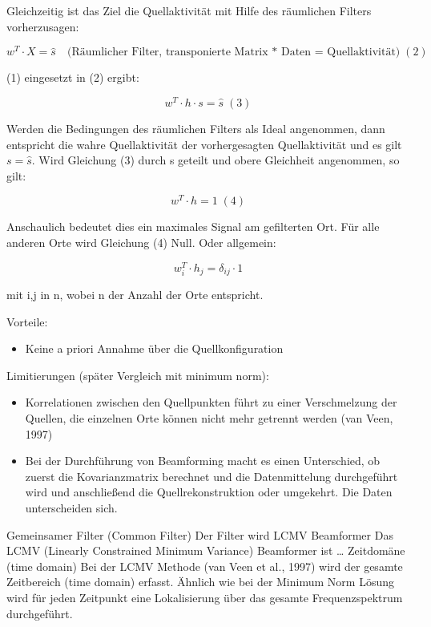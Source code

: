 \documentclass[doc,a4paper,12pt]{apa6}
\begin{document}
Gleichzeitig ist das Ziel die Quellaktivität mit Hilfe des räumlichen Filters vorherzusagen:

\begin{equation}
w^T \cdot X = \hat s \quad \text{(Räumlicher Filter, transponierte Matrix * Daten = Quellaktivität)} \;(2)
\end{equation}

(1) eingesetzt in (2) ergibt:

\begin{equation}
w^T \cdot h \cdot s = \hat s \;(3)
\end{equation}

Werden die Bedingungen des räumlichen Filters als Ideal angenommen, dann entspricht die wahre Quellaktivität der vorhergesagten Quellaktivität und es gilt $s = \hat s$.
Wird Gleichung (3) durch s geteilt und obere Gleichheit angenommen, so gilt:

\begin{equation}
w^T \cdot h = 1	\;(4)
\end{equation}

Anschaulich bedeutet dies ein maximales Signal am gefilterten Ort. Für alle anderen Orte wird Gleichung (4) Null. Oder allgemein:

\begin{equation}
w^T_i \cdot h_j = \delta_{ij} \cdot 1
\end{equation}

mit i,j in n, wobei n der Anzahl der Orte entspricht.

Vorteile:

\begin{itemize}
\item Keine a priori Annahme über die Quellkonfiguration
\end{itemize}

Limitierungen (später Vergleich mit minimum norm):

\begin{itemize}
\item Korrelationen zwischen den Quellpunkten führt zu einer Verschmelzung der Quellen, die einzelnen Orte können nicht mehr getrennt werden (van Veen, 1997)
\item Bei der Durchführung von Beamforming macht es einen Unterschied, ob zuerst die Kovarianzmatrix berechnet und die Datenmittelung durchgeführt wird und anschließend die Quellrekonstruktion oder umgekehrt. Die Daten unterscheiden sich.
\end{itemize}

Gemeinsamer Filter (Common Filter)
Der Filter wird 
LCMV Beamformer
Das LCMV (Linearly Constrained Minimum Variance) Beamformer ist … Zeitdomäne (time domain)
Bei der LCMV Methode (van Veen et al., 1997) wird der gesamte Zeitbereich (time domain) erfasst. Ähnlich wie bei der Minimum Norm Lösung wird für jeden Zeitpunkt eine Lokalisierung über das gesamte Frequenzspektrum durchgeführt.
\end{document}
